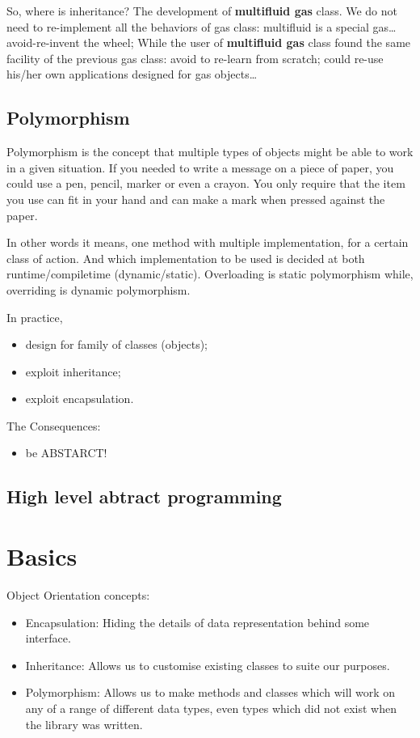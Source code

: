 \documentclass[11pt]{book} %
\begin{document}
So, where is inheritance? The development of \textbf{multifluid gas} class. We do not need to re-implement all the behaviors of gas class: multifluid is a special gas… avoid-re-invent the wheel;
While the user of \textbf{multifluid gas} class found the same facility of the previous gas class:
avoid to re-learn from scratch;
could re-use his/her own applications designed for gas objects…

\subsection{Polymorphism}
Polymorphism is the concept that multiple types of objects might be able to work in a given situation.
If you needed to write a message on a piece of paper, you could use a pen, pencil, marker or even a crayon. You only require that the item you use can fit in your hand and can make a mark when pressed against the paper.

In other words it means, one method with multiple implementation, for a certain class of action. And which implementation to be used is decided at both runtime/compiletime (dynamic/static). Overloading is static polymorphism while, overriding is dynamic polymorphism.

In practice,
\begin{itemize}
\item design for family of classes (objects);
\item exploit inheritance;
\item exploit encapsulation.
\end{itemize}

The Consequences:
\begin{itemize}
\item be ABSTARCT!
\end{itemize}

\subsection{High level abtract programming}

\section{Basics}

Object Orientation concepts:
\begin{itemize}
\item Encapsulation:
\subitem Hiding the details of data representation behind some interface.
\item Inheritance:
\subitem Allows us to customise existing classes to suite our purposes.
\item Polymorphism:
\subitem Allows us to make methods and classes which will work on any of a range of different data types, even types which did not exist when the library was written.
\end{itemize}
\end{document}
